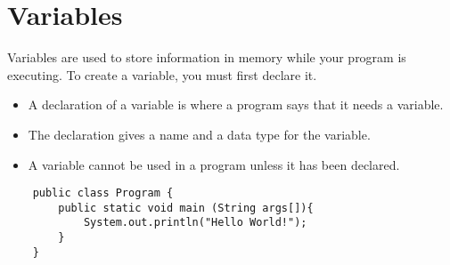 \documentclass[./Main.tex]{subfiles}
\begin{document}
    \section{Variables}
    Variables are used to store information in memory while your program is executing. To create a variable, you must
first declare it.
    \begin{itemize}
        \item A declaration of a variable is where a program says that it needs a variable.
        \item The declaration gives a name and a data type for the variable.
        \item A variable cannot be used in a program unless it has been declared.
    \end{itemize}

    \begin{lstlisting}
    public class Program {
        public static void main (String args[]){
            System.out.println("Hello World!");
        }
    }\end{lstlisting}
\end{document}
